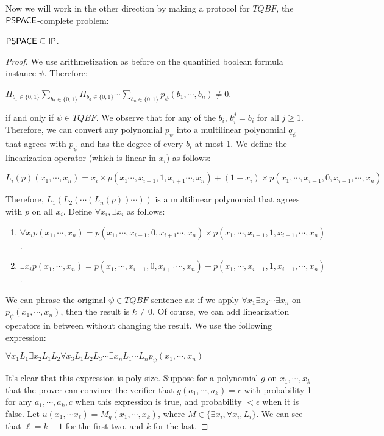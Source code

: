 Now we will work in the other direction by making a protocol for $TQBF$, the ${\mathsf{PSPACE}}$-complete problem:
\begin{theorem}
${\mathsf{PSPACE}} \subseteq {\ensuremath{\mathsf{IP}}}$.
\end{theorem}
\begin{proof}
We use arithmetization as before on the quantified boolean formula instance $\psi$. Therefore:
\begin{center}
$\Pi_{b_1 \in \{0, 1\}} \sum_{b_2 \in \{0, 1\}} \Pi_{b_3 \in \{0, 1\}} \cdots \sum_{b_n \in \{0, 1\}} p_{\psi}(b_1, \cdots, b_n) \ne 0$.
\end{center}
if and only if $\psi \in TQBF$. We observe that for any of the $b_i$, $b_i^j = b_i$ for all $j \ge 1$. Therefore, we can convert any polynomial $p_{\psi}$ into a multilinear polynomial $q_{\psi}$ that agrees with $p_{\psi}$ and has the degree of every $b_i$ at most 1. We define the linearization operator (which is linear in $x_i$) as follows:
\begin{center}
$L_i(p)(x_1, \cdots, x_n) = x_i \times p(x_1 \cdots, x_{i-1}, 1, x_{i+1}\cdots, x_n) + (1-x_i)\times p(x_1, \cdots, x_{i-1}, 0, x_{i+1}, \cdots, x_n)$
\end{center}
Therefore, $L_1(L_2(\cdots(L_n(p))\cdots))$ is a multilinear polynomial that agrees with $p$ on all $x_i$. Define $\forall x_i, \exists x_i$ as follows:
\begin{enumerate}
\item $\forall x_i p(x_1, \cdots, x_n) = p(x_1, \cdots, x_{i-1}, 0, x_{i+1}\cdots, x_n) \times p(x_1, \cdots, x_{i-1}, 1, x_{i+1}, \cdots, x_n)$.
\item $\exists x_i p(x_1, \cdots, x_n) = p(x_1, \cdots, x_{i-1}, 0, x_{i+1}\cdots, x_n) + p(x_1, \cdots, x_{i-1}, 1, x_{i+1}, \cdots, x_n)$.
\end{enumerate}
We can phrase the original $\psi \in TQBF$ sentence as: if we apply $\forall x_1 \exists x_2 \cdots \exists x_n$ on $p_{\psi}(x_1, \cdots, x_n)$, then the result is $k \ne 0$. Of course, we can add linearization operators in between without changing the result. We use the following expression:
\begin{center}
$\forall x_1 L_1 \exists x_2 L_1 L_2 \forall x_3 L_1 L_2 L_3 \cdots \exists x_n L_1 \cdots L_n p_{\psi}(x_1, \cdots, x_n)$
\end{center}
It's clear that this expression is poly-size. Suppose for a polynomial $g$ on $x_1, \cdots, x_k$ that the prover can convince the verifier that $g(a_1, \cdots, a_k) = c$ with probability 1 for any $a_1, \cdots, a_k, c$ when this expression is true, and probability $< \epsilon$ when it is false. Let $u(x_1, \cdots x_{\ell}) = M_g(x_1, \cdots, x_k)$, where $M \in \{\exists x_i, \forall x_i, L_{i}\}$. We can see that $\ell = k-1$ for the first two, and $k$ for the last. 


\end{proof}
